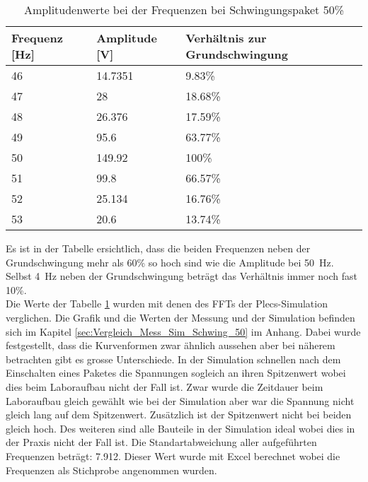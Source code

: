 \newpage
\begin{table}[ht!]
	\centering
	\begin{tabular}{|l|l|l|}
		\hline
		Frequenz {[}Hz{]} & Amplitude {[}V{]} & Verhältnis zur Grundschwingung \\ \hline
		46                & 14.7351           & 9.83\%                         \\ \hline
		47                & 28                & 18.68\%                        \\ \hline
		48                & 26.376            & 17.59\%                        \\ \hline
		49                & 95.6              & 63.77\%                        \\ \hline
		50                & 149.92            & 100\%                          \\ \hline
		51                & 99.8              & 66.57\%                        \\ \hline
		52                & 25.134            & 16.76\%                        \\ \hline
		53                & 20.6              & 13.74\%                        \\ \hline
	\end{tabular}
\caption{Amplitudenwerte bei der Frequenzen bei Schwingungspaket 50\%}\label{tab:Mess_Spannung_Schwing_50}
\end{table}

Es ist in der Tabelle ersichtlich, dass die beiden Frequenzen neben der Grundschwingung mehr als 60\% so hoch sind wie die Amplitude bei \SI{50}{Hz}. Selbst \SI{4}{Hz} neben der Grundschwingung beträgt das Verhältnis immer noch fast 10\%.\\

Die Werte der Tabelle \ref{tab:Mess_Spannung_Schwing_50} wurden mit denen des FFTs der Plecs-Simulation verglichen. Die Grafik und die Werten der Messung und der Simulation befinden sich im Kapitel \ref{sec:Vergleich_Mess_Sim_Schwing_50} im Anhang. Dabei wurde festgestellt, dass die Kurvenformen zwar ähnlich aussehen aber bei näherem betrachten gibt es grosse Unterschiede. In der Simulation schnellen nach dem Einschalten eines Paketes die Spannungen sogleich an ihren Spitzenwert wobei dies beim Laboraufbau nicht der Fall ist. 
Zwar wurde die Zeitdauer beim Laboraufbau gleich gewählt wie bei der Simulation aber war die Spannung nicht gleich lang auf dem Spitzenwert. Zusätzlich ist der Spitzenwert nicht bei beiden gleich hoch. Des weiteren sind alle Bauteile in der Simulation ideal wobei dies in der Praxis nicht der Fall ist. Die Standartabweichung aller aufgeführten Frequenzen beträgt: 7.912. Dieser Wert wurde mit Excel berechnet wobei die Frequenzen als Stichprobe angenommen wurden.




